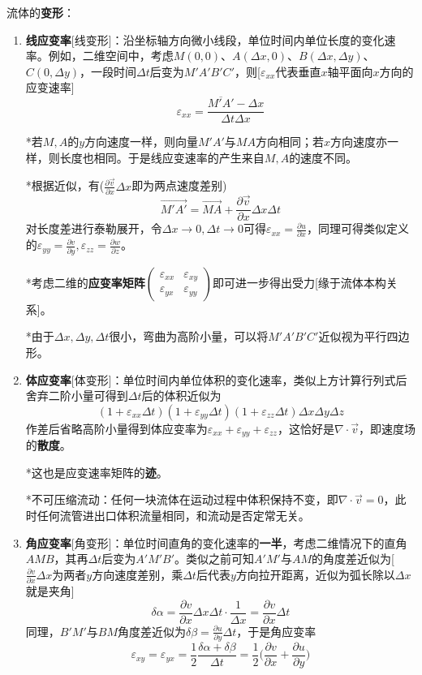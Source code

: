 \documentclass[a4paper,UTF8,fontset=windows]{ctexart}
\begin{document}
流体的\textbf{变形}：
\begin{enumerate}
    \item \textbf{线应变率}[线变形]：沿坐标轴方向微小线段，单位时间内单位长度的变化速率。例如，二维空间中，考虑$M(0,0)$、$A(\Delta x,0)$、$B(\Delta x,\Delta y)$、$C(0,\Delta y)$，一段时间$\Delta t$后变为$M'A'B'C'$，则[$\varepsilon_{xx}$代表垂直$x$轴平面向$x$方向的应变速率]
    $$\varepsilon_{xx}=\frac{\overline{M'A'}-\Delta x}{\Delta t\Delta x}$$
    
    *若$M,A$的$y$方向速度一样，则向量$M'A'$与$MA$方向相同；若$x$方向速度亦一样，则长度也相同。于是线应变速率的产生来自$M,A$的速度不同。

    *根据近似，有($\frac{\partial\vec{v}}{\partial x}\Delta x$即为两点速度差别)
    $$\vec{M'A'}=\vec{MA}+\frac{\partial\vec{v}}{\partial x}\Delta x\Delta t$$
    对长度差进行泰勒展开，令$\Delta x\to0,\Delta t\to0$可得$\varepsilon_{xx}=\frac{\partial u}{\partial x}$，同理可得类似定义的$\varepsilon_{yy}=\frac{\partial v}{\partial y},\varepsilon_{zz}=\frac{\partial w}{\partial z}$。

    *考虑二维的\textbf{应变率矩阵}$\begin{pmatrix}\varepsilon_{xx}&\varepsilon_{xy}\\\varepsilon_{yx}&\varepsilon_{yy}\end{pmatrix}$即可进一步得出受力[缘于流体本构关系]。
    
    *由于$\Delta x,\Delta y,\Delta t$很小，弯曲为高阶小量，可以将$M'A'B'C'$近似视为平行四边形。

    \item \textbf{体应变率}[体变形]：单位时间内单位体积的变化速率，类似上方计算行列式后舍弃二阶小量可得到$\Delta t$后的体积近似为
    $$(1+\varepsilon_{xx}\Delta t)(1+\varepsilon_{yy}\Delta t)(1+\varepsilon_{zz}\Delta t)\Delta x\Delta y\Delta z$$
    作差后省略高阶小量得到体应变率为$\varepsilon_{xx}+\varepsilon_{yy}+\varepsilon_{zz}$，这恰好是$\nabla\cdot\vec{v}$，即速度场的\textbf{散度}。

    *这也是应变速率矩阵的\textbf{迹}。

    *不可压缩流动：任何一块流体在运动过程中体积保持不变，即$\nabla\cdot\vec{v}=0$，此时任何流管进出口体积流量相同，和流动是否定常无关。

    \item \textbf{角应变率}[角变形]：单位时间直角的变化速率的\textbf{一半}，考虑二维情况下的直角$AMB$，其再$\Delta t$后变为$A'M'B'$。类似之前可知$A'M'$与$AM$的角度差近似为[$\frac{\partial v}{\partial x}\Delta x$为两者$y$方向速度差别，乘$\Delta t$后代表$y$方向拉开距离，近似为弧长除以$\Delta x$就是夹角]
    $$\delta\alpha=\frac{\partial v}{\partial x}\Delta x\Delta t\cdot\frac{1}{\Delta x}=\frac{\partial v}{\partial x}\Delta t$$
    同理，$B'M'$与$BM$角度差近似为$\delta\beta=\frac{\partial u}{\partial y}\Delta t$，于是角应变率
    $$\varepsilon_{xy}=\varepsilon_{yx}=\frac{1}{2}\frac{\delta\alpha+\delta\beta}{\Delta t}=\frac{1}{2}\bigg(\frac{\partial v}{\partial x}+\frac{\partial u}{\partial y}\bigg)$$


\end{enumerate}
\end{document}
